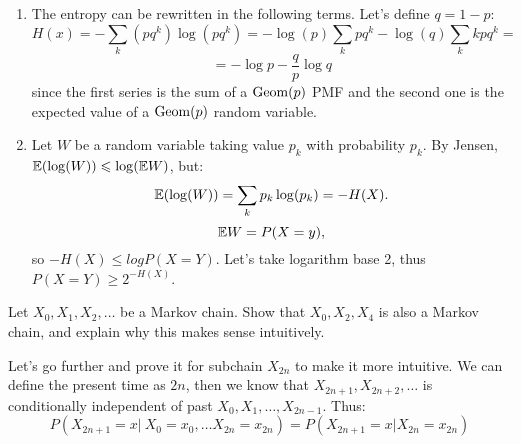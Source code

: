 \documentclass[12pt]{report}
\begin{document}
\begin{solution}
    \begin{enumerate}
        \item    The entropy can be rewritten in the following terms. Let's define $q = 1 - p$:
    \[
      H(x) = -\sum\limits_{k} (pq^k) \log (pq^k) = - \log (p) \sum\limits_k pq^k - \log(q) \sum\limits_k kpq^k =   
    \] 
    \[
        = -\log p - \dfrac{q}{p} \log q  
    \]
    since the first series is the sum of a $\operatorname{Geom}(p)$ PMF and the second one is the expected value of a $\operatorname{Geom}(p)$ random variable.
        \item Let $W$ be a random variable taking value $p_k$ with probability $p_k$. By Jensen, $\mathbb{E}(\log (W)) \leqslant \log (\mathbb{E} W)$, but:
        \[
            \mathbb{E} (\log (W)) = \sum\limits_{k} p_k\log(p_k) = - H(X).    
        \]
        \[
            \mathbb{E} W = P(X = y)  ,
        \]
        so $-H(X) \leq log P(X=Y)$. Let's take logarithm base 2, thus $P(X = Y) \geq 2^{-H(X)}$.
    \end{enumerate}

\end{solution}

\begin{problem}{}
    Let $X_0, X_1, X_2, \ldots $ be a Markov chain. Show that $X_0, X_2, X_4$ is also a Markov chain, and explain why this makes sense intuitively.
\end{problem}

\begin{solution}
    Let's go further and prove it for subchain $X_{2n}$ to make it more intuitive. We can define the present time as $2n$, then we know that $X_{2n+1}, X_{2n+2}, \ldots$ is conditionally independent of past $X_0, X_1, \ldots, X_{2n-1}$. Thus:
    \[
        P\left(X_{2n+1} = x| \ X_0 = x_0, \ldots X_{2n} = x_{2n}\right) = P\left( X_{2n+1} = x | X_{2n} = x_{2n}\right)
    \]
\end{solution}
\end{document}

